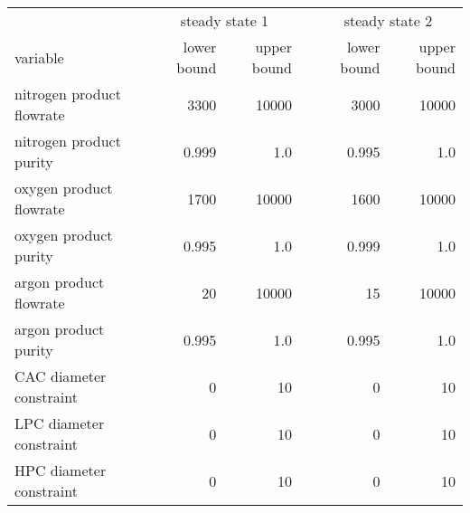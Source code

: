 \begin{tabular}{lcrrcrr}
    & & \multicolumn{2}{c}{steady state 1} & & \multicolumn{2}{c}{steady state 2} \\
    \rowcolor{white} variable & & lower bound & upper bound & & lower bound & upper bound \\ \hline
    nitrogen product flowrate & & 3300 & 10000 & & 3000 & 10000 \\
    nitrogen product purity & & 0.999 & 1.0 & & 0.995 & 1.0 \\
    oxygen product flowrate & & 1700 & 10000 & & 1600 & 10000 \\
    oxygen product purity & & 0.995 & 1.0 & & 0.999 & 1.0 \\
    argon product flowrate & & 20 & 10000 & & 15 & 10000 \\
    argon product purity & & 0.995 & 1.0 & & 0.995 & 1.0 \\
    CAC diameter constraint & & 0 & 10 & & 0 & 10 \\
    LPC diameter constraint & & 0 & 10 & & 0 & 10 \\
    HPC diameter constraint & & 0 & 10 & & 0 & 10 
\end{tabular}
